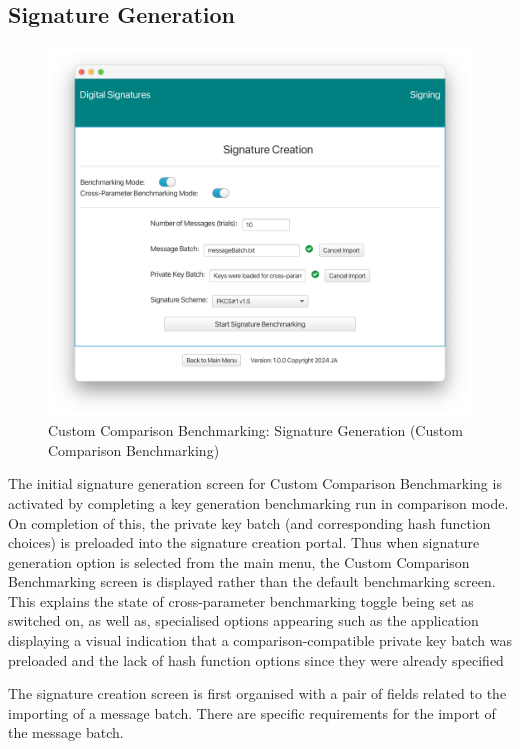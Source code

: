\documentclass[]{final_report}
\begin{document}
\subsection{Signature Generation}
\begin{figure}[H]
    \centering
    \includegraphics[scale= 0.4]{main_pictures/ui/custom8.png}
   \caption{Custom Comparison Benchmarking: Signature Generation (Custom Comparison Benchmarking)}
\end{figure}
The initial signature generation screen for Custom Comparison Benchmarking is activated by completing a key generation benchmarking run in comparison mode. On completion of this, the private key batch (and corresponding hash function choices) is preloaded into the signature creation portal. Thus when signature generation option is selected from the main menu, the Custom Comparison Benchmarking screen is displayed rather than the default benchmarking screen.
This explains the state of cross-parameter benchmarking toggle being set as switched on, as well as, specialised options appearing such as the application displaying a visual indication that a comparison-compatible private key batch was preloaded and the lack of hash function options since they were already specified

The signature creation screen is first organised with a pair of fields related to the importing of a message batch. There are specific requirements for the import of the message batch. 
\end{document}
